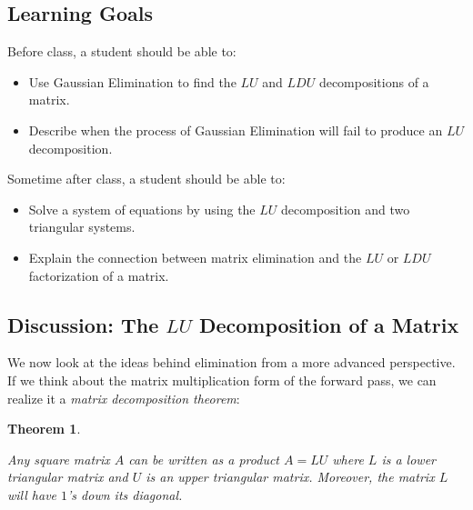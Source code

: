 \documentclass[10pt,]{book}
\theoremstyle{plain}
\newtheorem{theorem}{Theorem}[chapter]
\numberwithin{equation}{section}
\begin{document}
\subsection[Learning Goals]{Learning Goals}\label{subsection-47}

      Before class, a student should be able to:
\begin{itemize}
\item{}
        Use Gaussian Elimination to find the \(LU\) and \(LDU\)
        decompositions of a matrix.
      \item{}
        Describe when the process of Gaussian Elimination will fail to
        produce an \(LU\) decomposition.
      \end{itemize}
\par

      Sometime after class, a student should be able to:
\begin{itemize}
\item{}
        Solve a system of equations by using the \(LU\) decomposition and
        two triangular systems.
      \item{}
        Explain the connection between matrix elimination and the \(LU\)
        or \(LDU\) factorization of a matrix.
      \end{itemize}
\typeout{************************************************}
\typeout{************************************************}
\subsection[Discussion: The \(LU\) Decomposition of a Matrix]{Discussion: The \(LU\) Decomposition of a Matrix}\label{subsection-48}

      We now look at the ideas behind elimination from a more advanced
      perspective. If we think about the matrix multiplication form of the
      forward pass, we can realize it a \emph{matrix decomposition theorem}:
\begin{theorem}\label{theorem-2}

        Any square matrix \(A\) can be written as a product \(A = LU\)
        where \(L\)
        is a lower triangular matrix and \(U\) is an upper triangular matrix.
        Moreover, the matrix \(L\) will have \(1\)'s down its diagonal.
      \end{theorem}
\par
\end{document}
